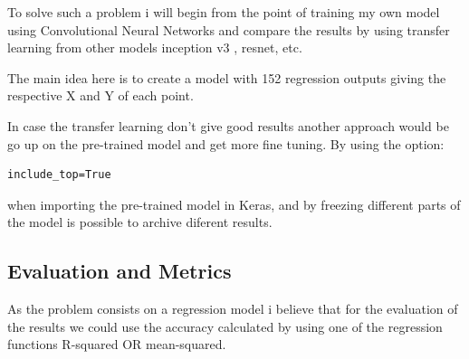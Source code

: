 \documentclass[11pt]{article}
\begin{document}
To solve such a problem i will begin from the point of training my own model 
using Convolutional Neural Networks and compare the results by using transfer
learning from other models inception v3 , resnet, etc.

The main idea here is to create a model with 152 regression outputs giving
the respective X and Y of each point.

In case the transfer learning don't give good results another approach would
be go up on the pre-trained model and get more fine tuning.
By using the option:

\begin{verbatim}
include_top=True
\end{verbatim}

when importing the pre-trained model in Keras, and by freezing different parts
of the model is possible to archive diferent results.



\subsection{Evaluation and Metrics}
\label{sec:orgb456879}

As the problem consists on a regression model i believe that for the
evaluation of the results we could use the accuracy calculated by using one
of the regression functions R-squared OR mean-squared. 





\end{document}
